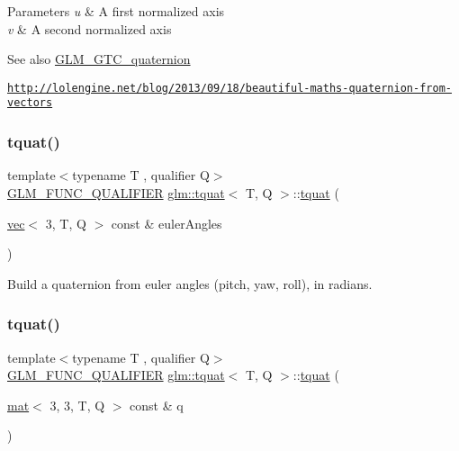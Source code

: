 \begin{DoxyParams}{Parameters}
{\em u} & A first normalized axis \\
\hline
{\em v} & A second normalized axis \\
\hline
\end{DoxyParams}
\begin{DoxySeeAlso}{See also}
\hyperlink{group__gtc__quaternion}{G\+L\+M\+\_\+\+G\+T\+C\+\_\+quaternion} 

\href{http://lolengine.net/blog/2013/09/18/beautiful-maths-quaternion-from-vectors}{\tt http\+://lolengine.\+net/blog/2013/09/18/beautiful-\/maths-\/quaternion-\/from-\/vectors} 
\end{DoxySeeAlso}
\mbox{\label{structglm_1_1tquat_a98289988d4e4970f9b45132f8f33759a}} 
\subsubsection{\texorpdfstring{tquat()}{tquat()}\hspace{0.1cm}{\footnotesize\ttfamily [8/12]}}
{\footnotesize\ttfamily template$<$typename T , qualifier Q$>$ \\
\hyperlink{setup_8hpp_a33fdea6f91c5f834105f7415e2a64407}{G\+L\+M\+\_\+\+F\+U\+N\+C\+\_\+\+Q\+U\+A\+L\+I\+F\+I\+ER} \hyperlink{structglm_1_1tquat}{glm\+::tquat}$<$ T, Q $>$\+::\hyperlink{structglm_1_1tquat}{tquat} (\begin{DoxyParamCaption}\item[{\hyperlink{structglm_1_1vec}{vec}$<$ 3, T, Q $>$ const \&}]{euler\+Angles }\end{DoxyParamCaption})}



Build a quaternion from euler angles (pitch, yaw, roll), in radians. 

\mbox{\label{structglm_1_1tquat_a38ce1c324ea9484c6d4f73785c9bea35}} 
\subsubsection{\texorpdfstring{tquat()}{tquat()}\hspace{0.1cm}{\footnotesize\ttfamily [9/12]}}
{\footnotesize\ttfamily template$<$typename T , qualifier Q$>$ \\
\hyperlink{setup_8hpp_a33fdea6f91c5f834105f7415e2a64407}{G\+L\+M\+\_\+\+F\+U\+N\+C\+\_\+\+Q\+U\+A\+L\+I\+F\+I\+ER} \hyperlink{structglm_1_1tquat}{glm\+::tquat}$<$ T, Q $>$\+::\hyperlink{structglm_1_1tquat}{tquat} (\begin{DoxyParamCaption}\item[{\hyperlink{structglm_1_1mat}{mat}$<$ 3, 3, T, Q $>$ const \&}]{q }\end{DoxyParamCaption})}

